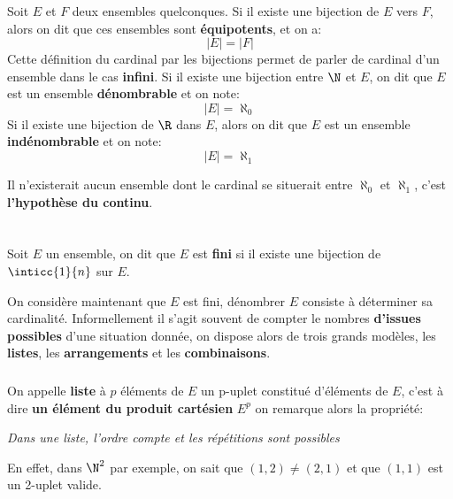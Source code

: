 \subsection*{}

Soit \(E\) et \(F\) deux ensembles quelconques.\+
Si il existe une bijection de \(E\) vers \(F\), alors on dit que ces ensembles sont \textbf{équipotents}, et on a:
\[
    |E| = |F|
\]
Cette définition du cardinal par les bijections permet de parler de cardinal d'un ensemble dans le cas \textbf{infini}.\+
Si il existe une bijection entre \(\N\) et \(E\), on dit que \(E\) est un ensemble \textbf{dénombrable} et on note:
\[
    |E| = \aleph_0
\]
Si il existe une bijection de \(\R\) dans \(E\), alors on dit que \(E\) est un ensemble \textbf{indénombrable} et on note:
\[
    |E| = \aleph_1
\]

Il n'existerait aucun ensemble dont le cardinal se situerait entre \(\aleph_0\) et \(\aleph_1\), c'est \textbf{l'hypothèse du continu}.

\chapter*{} %

Soit \(E\) un ensemble, on dit que \(E\) est \textbf{fini} si il existe une bijection de \(\inticc{1}{n}\) sur \(E\).\<

On considère maintenant que \(E\) est fini, dénombrer \(E\) consiste à déterminer sa cardinalité. Informellement il s'agit souvent de compter le nombres \textbf{d'issues possibles} d'une situation donnée, on dispose alors de trois grands modèles, les \textbf{listes}, les \textbf{arrangements} et les \textbf{combinaisons}.

\subsection*{}
On appelle \textbf{liste} à \(p\) éléments de \(E\) un p-uplet constitué d'éléments de \(E\), c'est à dire \textbf{un élément du produit cartésien} \(E^p\) on remarque alors la propriété:
\begin{center}
   \textit{
      Dans une liste, l'ordre compte et les répétitions sont possibles
   }
\end{center}
En effet, dans \(\N^2\) par exemple, on sait que \((1, 2) \neq (2, 1)\) et que \((1, 1)\) est un 2-uplet valide.\<

